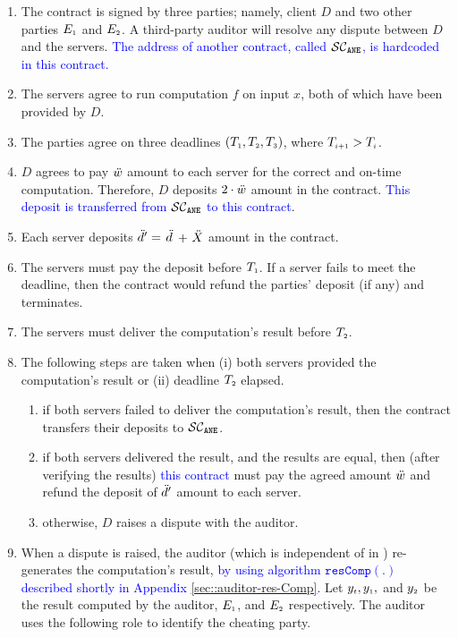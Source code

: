 \begin{enumerate}
%
\item The contract is signed by three parties; namely, client $ {D}$ and two other parties $E_{\scriptscriptstyle 1}$ and $E_{\scriptscriptstyle 2}$. A third-party auditor will resolve any dispute between $ { D}$ and the servers.  \textcolor{blue}{The address of another contract, called $\mathcal{SC}_{\mathtt{ANE}}$, is hardcoded in this contract.} 
%
\item The servers agree to run computation $f$ on input $x$, both of which have been provided by $ { D}$. 
%
\item The parties agree on three deadlines $(T_{\scriptscriptstyle 1}, T_{\scriptscriptstyle 2}, T_{\scriptscriptstyle 3})$, where $T_{\scriptscriptstyle i+1} > T_{\scriptscriptstyle i}$.
%
\item $ { D}$ agrees to pay $\ddot{w}$ amount to each server for the correct and on-time computation. Therefore, $ { D}$ deposits $2\cdot \ddot{w}$ amount in the contract. \textcolor{blue}{This deposit is transferred from $\mathcal{SC}_{\mathtt{ANE}}$ to this contract}.
%
\item Each server deposits \textcolor{blue}{$\ddot{d}'=$ }$\ddot{d}$\textcolor{blue}{$\ +\ \ddot{X}$} amount in the contract. 
%
\item The servers must pay the deposit before $T_{\scriptscriptstyle 1}$. If a server fails to meet the deadline, then the contract would refund the parties' deposit (if any) and terminates.  
%
\item The servers must deliver the computation's result before $T_{\scriptscriptstyle 2}$. 
%
\item  The following steps are taken when (i) both servers provided the computation's result or (ii) deadline $T_{\scriptscriptstyle 2}$ elapsed. 
%
\begin{enumerate}
%
\item if both servers failed to deliver the computation's result, then the contract transfers their deposits to \textcolor{blue}{$\mathcal{SC}_{\mathtt{ANE}}$}.
%
\item if both servers delivered the result, and the results are equal, then (after verifying the results) \textcolor{blue}{this contract} must pay the agreed
amount $\ddot{w}$ and refund the deposit of $\ddot{d}'$ amount to each server. 
%
\item\label{prisoner-cont-raise-disp} otherwise, $ { D}$ raises a dispute with the auditor.  
%
\end{enumerate}
%
\item When a dispute is raised, the auditor (which is independent of \aud in \fpsi) re-generates the computation's result, \textcolor{blue}{by using algorithm $\mathtt{resComp}(.)$ described shortly in Appendix \ref{sec::auditor-res-Comp}.} Let $y_{\scriptscriptstyle t}, y_{\scriptscriptstyle 1},$ and $y_{\scriptscriptstyle 2}$ be the result computed by the auditor, $E_{\scriptscriptstyle 1}$, and $E_{\scriptscriptstyle 2}$ respectively. The auditor uses the following role to identify the cheating party.  

\end{enumerate}
